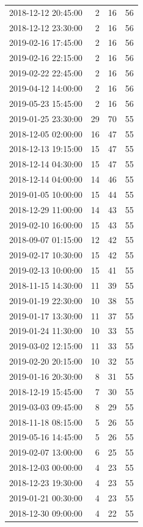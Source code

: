 \begin{tabular}{lrrr}
2018-12-12 20:45:00 & 2 & 16 & 56 \\
2018-12-12 23:30:00 & 2 & 16 & 56 \\
2019-02-16 17:45:00 & 2 & 16 & 56 \\
2019-02-16 22:15:00 & 2 & 16 & 56 \\
2019-02-22 22:45:00 & 2 & 16 & 56 \\
2019-04-12 14:00:00 & 2 & 16 & 56 \\
2019-05-23 15:45:00 & 2 & 16 & 56 \\
2019-01-25 23:30:00 & 29 & 70 & 55 \\
2018-12-05 02:00:00 & 16 & 47 & 55 \\
2018-12-13 19:15:00 & 15 & 47 & 55 \\
2018-12-14 04:30:00 & 15 & 47 & 55 \\
2018-12-14 04:00:00 & 14 & 46 & 55 \\
2019-01-05 10:00:00 & 15 & 44 & 55 \\
2018-12-29 11:00:00 & 14 & 43 & 55 \\
2019-02-10 16:00:00 & 15 & 43 & 55 \\
2018-09-07 01:15:00 & 12 & 42 & 55 \\
2019-02-17 10:30:00 & 15 & 42 & 55 \\
2019-02-13 10:00:00 & 15 & 41 & 55 \\
2018-11-15 14:30:00 & 11 & 39 & 55 \\
2019-01-19 22:30:00 & 10 & 38 & 55 \\
2019-01-17 13:30:00 & 11 & 37 & 55 \\
2019-01-24 11:30:00 & 10 & 33 & 55 \\
2019-03-02 12:15:00 & 11 & 33 & 55 \\
2019-02-20 20:15:00 & 10 & 32 & 55 \\
2019-01-16 20:30:00 & 8 & 31 & 55 \\
2018-12-19 15:45:00 & 7 & 30 & 55 \\
2019-03-03 09:45:00 & 8 & 29 & 55 \\
2018-11-18 08:15:00 & 5 & 26 & 55 \\
2019-05-16 14:45:00 & 5 & 26 & 55 \\
2019-02-07 13:00:00 & 6 & 25 & 55 \\
2018-12-03 00:00:00 & 4 & 23 & 55 \\
2018-12-23 19:30:00 & 4 & 23 & 55 \\
2019-01-21 00:30:00 & 4 & 23 & 55 \\
2018-12-30 09:00:00 & 4 & 22 & 55 \\

\end{tabular}

